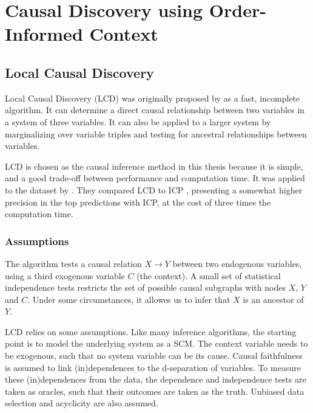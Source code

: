 \newpage
\section{Causal Discovery using Order-Informed Context}
\label{chapter:methodcontext}


\subsection{Local Causal Discovery}

Local Causal Discovery (LCD) was originally proposed by \citet{cooper1997simple} as a fast, incomplete algorithm. It can determine a direct causal relationship between two variables in a system of three variables. It can also be applied to a larger system by marginalizing over variable triples and testing for ancestral relationships between variables. 

LCD is chosen as the causal inference method in this thesis because it is simple, and a good trade-off between performance and computation time. It was applied to the \citet{kemmeren2014large} dataset by \citet{versteeg2019boosting}. They compared LCD to ICP \citep{peters2016causal}, presenting a somewhat higher precision in the top predictions with ICP, at the cost of three times the computation time. 

\subsubsection{Assumptions}

The algorithm tests a causal relation $X\to Y$ between two endogenous variables, using a third exogenous variable $C$ (the context). A small set of statistical independence tests restricts the set of possible causal subgraphs with nodes $X$, $Y$ and $C$. Under some circumstances, it allowes us to infer  that $X$ is an ancestor of $Y$.

LCD relies on some assumptions. Like many inference algorithms, the starting point is to model the underlying system as a SCM. The context variable needs to be exogenous, such that no system variable can be its cause. Causal faithfulness is assumed to link (in)dependences to the d-separation of variables. To measure these (in)dependences from the data, the dependence and independence tests are taken as oracles, such that their outcomes are taken as the truth. Unbiased data selection and acyclicity are also assumed. 


